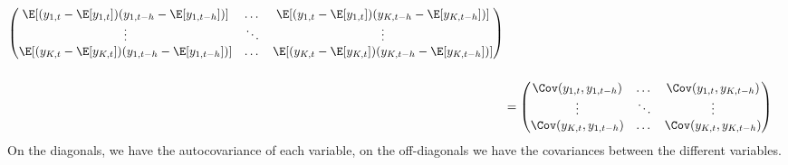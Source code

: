 \begin{enumerate}
\begin{sol}
\begin{align*}
\begin{pmatrix}
                           \E[(y_{1,t}- \E[y_{1,t}])(y_{1,{t-h}} - \E[y_{1,{t-h}}])]
                            & \dots
                            & \E[(y_{1,t} - \E[y_{1,t}])(y_{K,{t-h}} - \E[y_{K,{t-h}}])]
                           \\
                           \vdots
                            & \ddots
                            & \vdots
                           \\
                           \E[(y_{K,t}- \E[y_{K,t}])(y_{1,{t-h}} - \E[y_{1,{t-h}}])]
                            & \dots
                            & \E[(y_{K,t} - \E[y_{K,t}])(y_{K,{t-h}} - \E[y_{K,{t-h}}])]
                       \end{pmatrix}
                  \\[0.5cm]
                   & =\begin{pmatrix}
                          \Cov(y_{1,t},y_{1,{t-h}})
                           & \dots
                           & \Cov(y_{1,t},y_{K,{t-h}})
                          \\
                          \vdots
                           & \ddots
                           & \vdots
                          \\
                          \Cov(y_{K,t},y_{1,{t-h}})
                           & \dots
                           & \Cov(y_{K,t},y_{K,{t-h}})
                      \end{pmatrix}
              \end{align*}
              On the diagonals, we have the autocovariance of each variable, on the off-diagonals we have the covariances between the different variables.
          \end{sol}
\end{enumerate}
